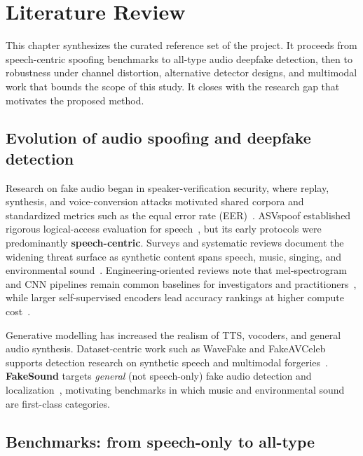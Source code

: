 \chapter{Literature Review}
\label{ch:literature}

This chapter synthesizes the curated reference set of the project. It proceeds from speech-centric spoofing benchmarks to all-type audio deepfake detection, then to robustness under channel distortion, alternative detector designs, and multimodal work that bounds the scope of this study. It closes with the research gap that motivates the proposed method.

\section{Evolution of audio spoofing and deepfake detection}

Research on fake audio began in speaker-verification security, where replay, synthesis, and voice-conversion attacks motivated shared corpora and standardized metrics such as the equal error rate (EER)~\cite{kinnunen2017detection,wang2020asvspoof}. ASVspoof established rigorous logical-access evaluation for speech~\cite{wang2020asvspoof}, but its early protocols were predominantly \textbf{speech-centric}. Surveys and systematic reviews document the widening threat surface as synthetic content spans speech, music, singing, and environmental sound~\cite{shaaban2023ieeeAccess,zhang2025sensorsSurvey,alnaqbi2026systematic,nguyenle2026deepfakeSurvey,raza2026foundationSurvey}. Engineering-oriented reviews note that mel-spectrogram and CNN pipelines remain common baselines for investigators and practitioners~\cite{shaaban2025engineeringReports,mcuba2023deeplearning}, while larger self-supervised encoders lead accuracy rankings at higher compute cost~\cite{li2024sonar}.

Generative modelling has increased the realism of TTS, vocoders, and general audio synthesis. Dataset-centric work such as WaveFake and FakeAVCeleb supports detection research on synthetic speech and multimodal forgeries~\cite{frank2021wavefake,khalid2021fakeavceleb}. \textbf{FakeSound} targets \emph{general} (not speech-only) fake audio detection and localization~\cite{xie2024fakesound}, motivating benchmarks in which music and environmental sound are first-class categories.

\section{Benchmarks: from speech-only to all-type}

